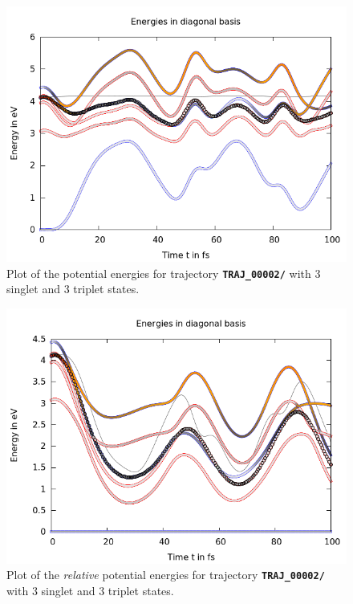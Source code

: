 \documentclass[a4paper,11pt,DIV=15,openany]{scrbook}
\newcommand{\ttt}[1]{\textbf{\texttt{#1}}}
\begin{document}
\begin{figure}[tb]
  \centering
  \includegraphics[width=\textwidth]{figures/energy.png}
  \caption{Plot of the potential energies for trajectory \ttt{TRAJ\_00002/} with 3 singlet and 3 triplet states.}
  \label{fig:en}
\end{figure}
\begin{figure}[tb]
  \centering
  \includegraphics[width=\textwidth]{figures/energy_rel.png}
  \caption{Plot of the \emph{relative} potential energies for trajectory \ttt{TRAJ\_00002/} with 3 singlet and 3 triplet states.  }
  \label{fig:en_rel}
\end{figure}
\end{document}

